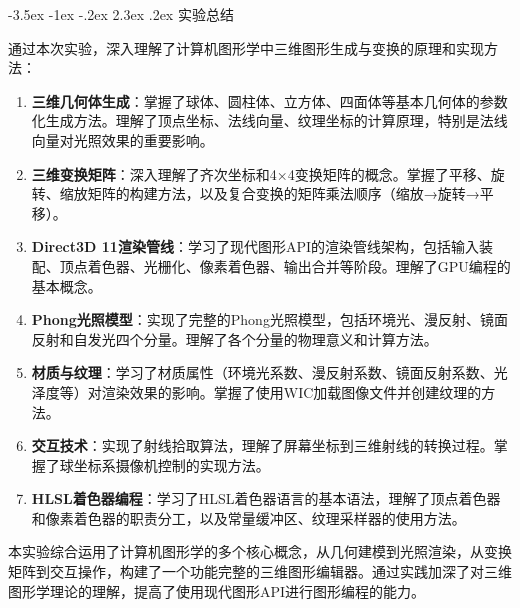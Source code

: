 \documentclass[12pt,a4paper]{article}
\makeatletter
\renewcommand\section{\@startsection{section}{1}{\z@}%
    {-3.5ex \@plus -1ex \@minus -.2ex}%
    {2.3ex \@plus.2ex}%
    {\normalfont\Large\bfseries\songti}}
\makeatother
\begin{document}
\clearpage

\begin{tcolorbox}

\section{实验总结}

通过本次实验，深入理解了计算机图形学中三维图形生成与变换的原理和实现方法：

\begin{enumerate}
    \item \textbf{三维几何体生成}：掌握了球体、圆柱体、立方体、四面体等基本几何体的参数化生成方法。理解了顶点坐标、法线向量、纹理坐标的计算原理，特别是法线向量对光照效果的重要影响。
    
    \item \textbf{三维变换矩阵}：深入理解了齐次坐标和4×4变换矩阵的概念。掌握了平移、旋转、缩放矩阵的构建方法，以及复合变换的矩阵乘法顺序（缩放→旋转→平移）。
    
    \item \textbf{Direct3D 11渲染管线}：学习了现代图形API的渲染管线架构，包括输入装配、顶点着色器、光栅化、像素着色器、输出合并等阶段。理解了GPU编程的基本概念。
    
    \item \textbf{Phong光照模型}：实现了完整的Phong光照模型，包括环境光、漫反射、镜面反射和自发光四个分量。理解了各个分量的物理意义和计算方法。
    
    \item \textbf{材质与纹理}：学习了材质属性（环境光系数、漫反射系数、镜面反射系数、光泽度等）对渲染效果的影响。掌握了使用WIC加载图像文件并创建纹理的方法。
    
    \item \textbf{交互技术}：实现了射线拾取算法，理解了屏幕坐标到三维射线的转换过程。掌握了球坐标系摄像机控制的实现方法。
    
    \item \textbf{HLSL着色器编程}：学习了HLSL着色器语言的基本语法，理解了顶点着色器和像素着色器的职责分工，以及常量缓冲区、纹理采样器的使用方法。
\end{enumerate}

本实验综合运用了计算机图形学的多个核心概念，从几何建模到光照渲染，从变换矩阵到交互操作，构建了一个功能完整的三维图形编辑器。通过实践加深了对三维图形学理论的理解，提高了使用现代图形API进行图形编程的能力。
\end{tcolorbox}
\end{document}
